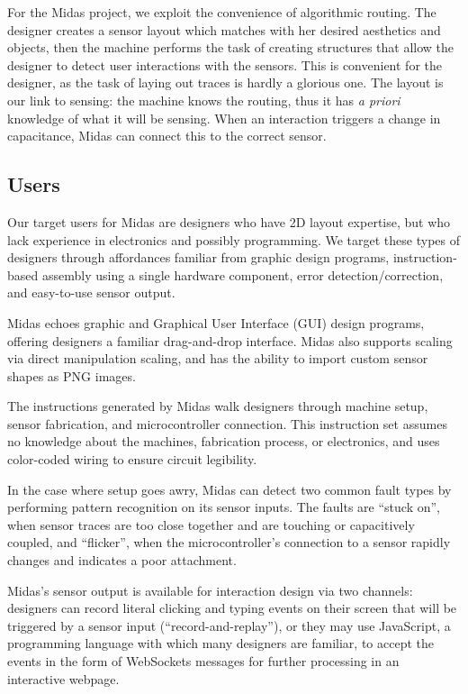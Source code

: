 For the Midas project, we exploit the convenience of algorithmic routing. The designer creates a sensor layout which matches with her desired aesthetics and objects, then the machine performs the task of creating structures that allow the designer to detect user interactions with the sensors. This is convenient for the designer, as the task of laying out traces is hardly a glorious one. The layout is our link to sensing: the machine knows the routing, thus it has \emph{a priori} knowledge of what it will be sensing. When an interaction triggers a change in capacitance, Midas can connect this to the correct sensor.

\subsection{Users}

Our target users for Midas are designers who have 2D layout expertise, but who lack experience in electronics and possibly programming.  We target these types of designers through affordances familiar from graphic design programs, instruction-based assembly using a single hardware component, error detection/correction, and easy-to-use sensor output.

Midas echoes graphic and Graphical User Interface (GUI) design programs, offering designers a familiar drag-and-drop interface.  Midas also supports scaling via direct manipulation scaling, and has the ability to import custom sensor shapes as PNG images.

The instructions generated by Midas walk designers through machine setup, sensor fabrication, and microcontroller connection.  This instruction set assumes no knowledge about the machines, fabrication process, or electronics, and uses color-coded wiring to ensure circuit legibility.

In the case where setup goes awry, Midas can detect two common fault types by performing pattern recognition on its sensor inputs.  The faults are ``stuck on'', when sensor traces are too close together and are touching or capacitively coupled, and ``flicker'', when the microcontroller's connection to a sensor rapidly changes and indicates a poor attachment.

Midas's sensor output is available for interaction design via two channels: designers can record literal clicking and typing events on their screen that will be triggered by a sensor input (``record-and-replay''), or they may use JavaScript, a programming language with which many designers are familiar, to accept the events in the form of WebSockets messages for further processing in an interactive webpage.


